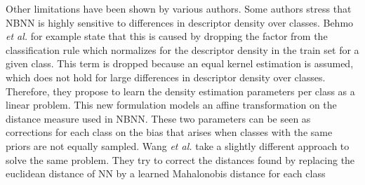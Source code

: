 Other limitations have been shown by various authors.\cite{behmo2010towards, mccann2012local,timofte2012iterative,tuytelaars2011nbnn,wang2011improved} Some authors \cite{behmo2010towards,wang2011improved} stress that NBNN is highly sensitive to differences in descriptor density over classes. Behmo \emph{et al.} for example state that this is caused by dropping the factor from the classification rule which normalizes for the descriptor density in the train set for a given class. This term is dropped because an equal kernel estimation is assumed, which does not hold for large differences in descriptor density over classes. \cite{behmo2010towards} Therefore, they propose to learn the density estimation parameters per class as a linear problem. This new formulation models an affine transformation on the distance measure used in NBNN. These two parameters can be seen as corrections for each class on the bias that arises when classes with the same priors are not equally sampled. Wang \emph{et al.} take a slightly different approach to solve the same problem. They try to correct the distances found by replacing the euclidean distance of NN by a learned Mahalonobis distance for each class 

